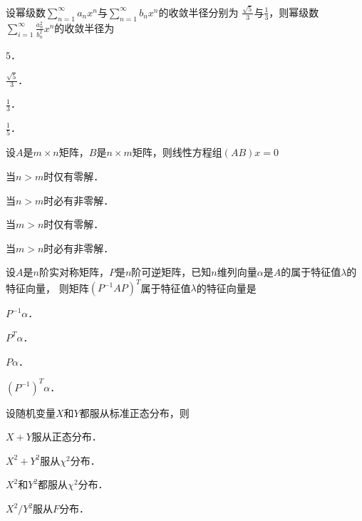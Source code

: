 \documentclass[plain,noanswer,medmath]{../../template/jnuexam}
\begin{document}
\begin{problem}
设幂级数$\sum_{n = 1}^{\infty}a_n x^n$与$\sum_{n = 1}^{\infty}b_n x^n$的收敛半径分别为
$\frac{\sqrt{5}}{3}$与$\frac{1}{3}$，则幂级数$\sum_{i = 1}^{\infty}\frac{a^2_n}{b^2_n}x^n$的收敛半径为\pickout{}
\begin{abcd}
\item $5$．
\item $\frac{\sqrt{5}}{3}$．
\item $\frac{1}{3}$．
\item $\frac{1}{5}$．
\end{abcd}
\end{problem}


\begin{problem}
设$A$是$m \times n$矩阵，$B$是$n \times m$矩阵，则线性方程组$(AB)x = 0$\pickout{}
\begin{abcd}
\item 当$n > m$时仅有零解．
\item 当$n > m$时必有非零解．
\item 当$m > n$时仅有零解．
\item 当$m > n$时必有非零解．
\end{abcd}
\end{problem}


\begin{problem}
设$A$是$n$阶实对称矩阵，$P$是$n$阶可逆矩阵，已知$n$维列向量$\alpha$是$A$的属于特征值$\lambda$的特征向量，
则矩阵$\left(P^{-1} AP \right)^T$属于特征值$\lambda$的特征向量是\pickout{}
\begin{abcd}
\item $P^{-1}\alpha$．
\item $P^T\alpha$．
\item $P\alpha$．
\item $\left(P^{-1} \right)^T\alpha$．
\end{abcd}
\end{problem}


\begin{problem}
设随机变量$X$和$Y$都服从标准正态分布，则\pickout{}
\begin{abcd}
\item $X + Y$服从正态分布．
\item $X^2 + Y^2$服从$\chi^2$分布．
\item $X^2$和$Y^2$都服从$\chi^2$分布．
\item $X^2/Y^2$服从$F$分布．
\end{abcd}
\end{problem}
\end{document}
